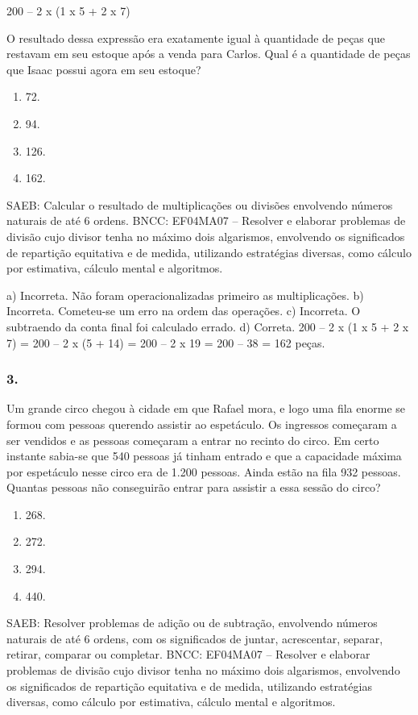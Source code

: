 \begin{enumerate}
\begin{escolha}
200 -- 2 x (1 x 5 + 2 x 7)

O resultado dessa expressão era exatamente igual à quantidade de peças
que restavam em seu estoque após a venda para Carlos. Qual é a
quantidade de peças que Isaac possui agora em seu estoque?

\begin{enumerate}
\def\labelenumi{\alph{enumi})}
\item
  72.
\item
  94.
\item
  126.
\item
  162.
\end{enumerate}

SAEB: Calcular o resultado de multiplicações ou divisões envolvendo números naturais de até 6 ordens.
BNCC: EF04MA07 -- Resolver e elaborar problemas de divisão cujo divisor tenha no máximo dois algarismos,
envolvendo os significados de repartição equitativa e de medida, utilizando estratégias diversas,
como cálculo por estimativa, cálculo mental e algoritmos.

a) Incorreta. Não foram operacionalizadas primeiro as multiplicações.
b) Incorreta. Cometeu-se um erro na ordem das operações.
c) Incorreta. O subtraendo da conta final foi calculado errado.
d) Correta. 200 -- 2 x (1 x 5 + 2 x 7) = 200 -- 2 x (5 + 14) = 200 -- 2 x 19 = 200 -- 38 = 162 peças.

\subsubsection{3.}\label{section-25}

Um grande circo chegou à cidade em que Rafael mora, e logo uma fila
enorme se formou com pessoas querendo assistir ao espetáculo. Os
ingressos começaram a ser vendidos e as pessoas começaram a entrar no
recinto do circo. Em certo instante sabia-se que 540 pessoas já tinham
entrado e que a capacidade máxima por espetáculo nesse circo era de 1.200 pessoas. Ainda estão na fila 932 pessoas. Quantas pessoas não
conseguirão entrar para assistir a essa sessão do circo?

\begin{enumerate}
\def\labelenumi{\alph{enumi})}
\item
  268.
\item
  272.
\item
  294.
\item
  440.
\end{enumerate}

SAEB: Resolver problemas de adição ou de subtração, envolvendo números naturais de até 6 ordens, com os significados de juntar, acrescentar, separar, retirar, comparar ou completar.
BNCC: EF04MA07 -- Resolver e elaborar problemas de divisão cujo divisor tenha no máximo dois algarismos,
envolvendo os significados de repartição equitativa e de medida, utilizando estratégias diversas,
como cálculo por estimativa, cálculo mental e algoritmos.


\end{escolha}
\end{enumerate}
